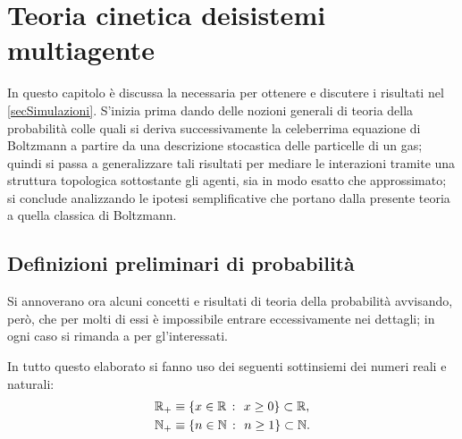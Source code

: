 

\chapter[Teoria cinetica dei sistemi multiagente]{\texorpdfstring
  {Teoria cinetica dei\newline sistemi multiagente}
  {Teoria cinetica dei sistemi multiagente}%
}\label{secTCSM}

  In questo capitolo è discussa la \TCSMA{} necessaria per ottenere e discutere i risultati nel \cref{secSimulazioni}. S'inizia prima dando delle nozioni generali di teoria della probabilità colle quali si deriva successivamente la celeberrima equazione di Boltzmann a partire da una descrizione stocastica delle particelle di un gas; quindi si passa a generalizzare tali risultati per mediare le interazioni tramite una struttura topologica sottostante gli agenti, sia in modo esatto che approssimato; si conclude analizzando le ipotesi semplificative che portano dalla presente teoria a quella classica di Boltzmann.
        

  \section{Definizioni preliminari di probabilità}\label{secDefinizioniPreliminariProbabilitàTCSMA}

    Si annoverano ora alcuni concetti e risultati di teoria della probabilità avvisando, però, che per molti di essi è impossibile entrare eccessivamente nei dettagli; in ogni caso si rimanda a \cite{Durrett2019PTE} per gl'interessati.

    \begin{dfn}[Semirette]
      \label{defSemirettaInteraRealePositiva}
      In tutto questo elaborato si fanno uso dei seguenti sottinsiemi dei numeri reali e naturali:
      \begin{equation*} %
        \begin{aligned}
          \RPlus&\equiv\{x\in\mathbb R\ \colon\ x\ge0\}\subset\mathbb R,\\
          \NPlus&\equiv\{n\in\mathbb N\ \colon\ n\geq1\}\subset\mathbb N.
        \end{aligned}
      \end{equation*}
    \end{dfn}

